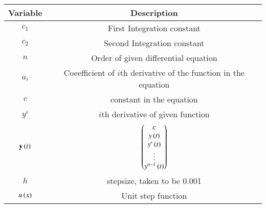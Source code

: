 \begin{tabular}[12pt]{ |c| c|}
    \hline
    \textbf{Variable} & \textbf{Description}\\ 
    \hline
    $c_1$ &First Integration constant\\
    \hline
    $c_2$ &Second Integration constant\\
    \hline
    $n$ & Order of given differential equation\\
    \hline
    $a_i$ & Coeefficient of $i$th derivative of the function in the equation\\
    \hline
    $c$ & constant in the equation\\
    \hline
    $y^i$ & $i$th derivative of given function\\
    \hline
    $\mathbf{y}\left(t\right)$ & $\begin{pmatrix}c \\ y\left(t\right) \\ y^\prime\left(t\right) \\ \vdots \\ y^{n-1}\left(t\right)\end{pmatrix}$\\
    \hline
    $h$ & stepsize, taken to be 0.001\\
    \hline
    $u\left(x\right)$ & Unit step function\\
    \hline
    \end{tabular}
